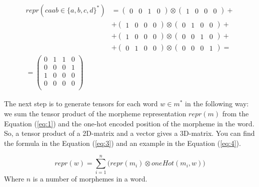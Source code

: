 \documentclass[leqno]{article}
\begin{document}
\begin{equation}
    \begin{aligned}
        repr(caab \in \{a, b, c, d\}^*) &= 
        \begin{pmatrix} 0 & 0 & 1 & 0 \end{pmatrix}
        \otimes \begin{pmatrix} 1 & 0 & 0 & 0 \end{pmatrix} + \\
        &+ \begin{pmatrix} 1 & 0 & 0 & 0 \end{pmatrix}
        \otimes \begin{pmatrix} 0 & 1 & 0 & 0 \end{pmatrix} + \\
        &+ \begin{pmatrix} 1 & 0 & 0 & 0 \end{pmatrix}
        \otimes \begin{pmatrix} 0 & 0 & 1 & 0 \end{pmatrix} + \\
        &+ \begin{pmatrix} 0 & 1 & 0 & 0 \end{pmatrix}
        \otimes \begin{pmatrix} 0 & 0 & 0 & 1 \end{pmatrix} = \\
        = \begin{pmatrix}
        0 & 1 & 1 & 0 \\
        0 & 0 & 0 & 1 \\
        1 & 0 & 0 & 0 \\
        0 & 0 & 0 & 0 \\
        \end{pmatrix}
    \end{aligned}
\end{equation}

The next step is to generate tensors for each word $w \in m^*$ in the following way: we sum the tensor product of the morpheme representation $repr(m)$
from the Equation (\ref{eq:1}) and the one-hot encoded position of the morpheme
in the word. So, a tensor product of a 2D-matrix and a vector gives
a 3D-matrix. You can find the formula in the Equation (\ref{eq:3}) and
an example in the Equation (\ref{eq:4}).

\begin{equation}\label{eq:3}
    repr(w) = \sum_{i=1}^{n}
    \bigg(repr(m_i) \otimes oneHot(m_i, w)\bigg)
\end{equation}
Where $n$ is a number of morphemes in a word.
\end{document}
